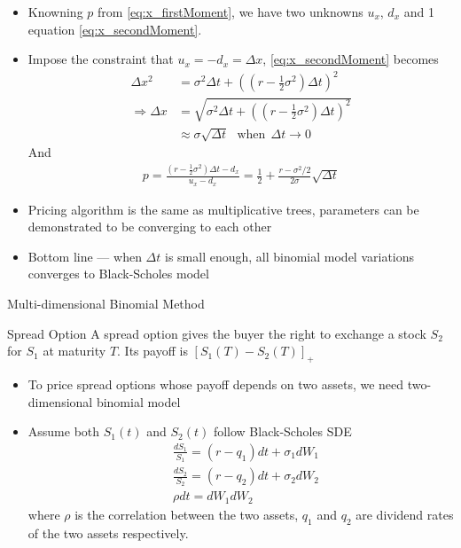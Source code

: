 \begin{frame}
\begin{itemize}
\item Knowning $p$ from \eqref{eq:x_firstMoment}, we have two unknowns $u_x$, $d_x$ and 1 equation \eqref{eq:x_secondMoment}.
\item Impose the constraint that $u_x = -d_x = \Delta x$, \eqref{eq:x_secondMoment} becomes
\begin{align}
\Delta x^2 & = \sigma^2 \Delta t + ((r-\frac12 \sigma^2)\Delta t)^2 \\
\Rightarrow \Delta x & = \sqrt{\sigma^2 \Delta t + ((r-\frac12 \sigma^2)\Delta t)^2} \\
             & \approx \sigma \sqrt{\Delta t}  ~~~\text{when}~~\Delta t \rightarrow 0
\end{align}
And
\begin{align}
p = \frac{(r - \frac12 \sigma^2) \Delta t - d_x}{u_x - d_x} = \frac12 + \frac{r- \sigma^2/2}{2 \sigma} \sqrt{\Delta t}
\end{align}
\item Pricing algorithm is the same as multiplicative trees, parameters can be demonstrated to be converging to each other
\item Bottom line --- when $\Delta t$ is small enough, all binomial model variations converges to Black-Scholes model
\end{itemize}
\end{frame}

\begin{frame}{Multi-dimensional Binomial Method}
\begin{block}{Spread Option}
A spread option gives the buyer the right to exchange a stock $S_2$ for $S_1$ at maturity $T$. Its payoff is $[S_1(T) - S_2(T)]_+$
\end{block}
\begin{itemize}
\item To price spread options whose payoff depends on two assets, we need two-dimensional binomial model
\item Assume both $S_1(t)$ and $S_2(t)$ follow Black-Scholes SDE
\begin{align}
& \frac{d S_1}{S_1} = (r-q_1) dt + \sigma_1 dW_1 \\
& \frac{d S_2}{S_2} = (r-q_2) dt + \sigma_2 dW_2 \\
& \rho dt = dW_1 dW_2
\end{align}
where $\rho$ is the correlation between the two assets, $q_1$ and $q_2$ are dividend rates of the two assets respectively.
\end{itemize}
\end{frame}

